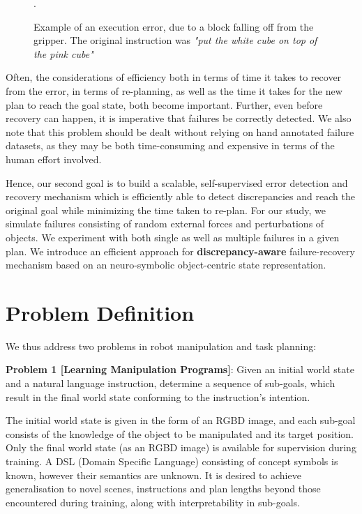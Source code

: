 \begin{figure}
\begin{minipage}{0.3\textwidth}
    \end{minipage}
    \caption{Example of an execution error, due to a block falling off from the gripper. The original instruction was \emph{"put the white cube on top of the pink cube"}}.
    \label{fig:error-example}
\end{figure}

Often, the considerations of efficiency both in terms of time it takes to recover from the error, in terms of re-planning, as well as the time it takes for the new plan to reach the goal state, both become important. Further, even before recovery can happen, it is imperative that failures be correctly detected. We also note that this problem should be dealt without relying on hand annotated failure datasets, as they may be both time-consuming and expensive in terms of the human effort involved.  
%

Hence, our second goal is to build a scalable, self-supervised error detection and recovery mechanism which is efficiently able to detect discrepancies and reach the original goal while minimizing the time taken to re-plan. For our study, we simulate failures consisting of random external forces and perturbations of objects. We experiment with both single as well as multiple failures in a given plan. We introduce an efficient approach for \textbf{discrepancy-aware} failure-recovery mechanism based on an neuro-symbolic object-centric state representation.


\section{Problem Definition}

We thus address two problems in robot manipulation and task planning:

\textbf{Problem 1 [Learning Manipulation Programs]}: Given an initial world state and a natural language instruction, determine a sequence of sub-goals, which result in the final world state conforming to the instruction's intention.

The initial world state is given in the form of an RGBD image, and each sub-goal consists of the knowledge of the object to be manipulated and its target position. Only the final world state (as an RGBD image) is available for supervision during training. A DSL (Domain Specific Language) consisting of concept symbols is known, however their semantics are unknown. It is desired to achieve generalisation to novel scenes, instructions and plan lengths beyond those encountered during training, along with interpretability in sub-goals.

